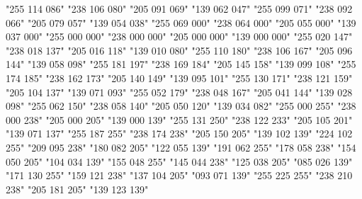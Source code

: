            {"255 114 086"}
           {"238 106 080"}
           {"205 091 069"}
           {"139 062 047"}
          {"255 099 071"}
          {"238 092 066"}
          {"205 079 057"}
          {"139 054 038"}        
      {"255 069 000"}
      {"238 064 000"}
      {"205 055 000"}
      {"139 037 000"}
             {"255 000 000"}
             {"238 000 000"}
             {"205 000 000"}
             {"139 000 000"}
       {"255 020 147"}
       {"238 018 137"}
       {"205 016 118"}
       {"139 010 080"}
        {"255 110 180"}
        {"238 106 167"}
        {"205 096 144"}
        {"139 058 098"}        
            {"255 181 197"}
            {"238 169 184"}
            {"205 145 158"}
            {"139 099 108"}
      {"255 174 185"}
      {"238 162 173"}
      {"205 140 149"}
      {"139 095 101"}        
 {"255 130 171"}
 {"238 121 159"}
 {"205 104 137"}
 {"139 071 093"}
          {"255 052 179"}
          {"238 048 167"}
          {"205 041 144"}
          {"139 028 098"}
      {"255 062 150"}
      {"238 058 140"}
      {"205 050 120"}
      {"139 034 082"}
         {"255 000 255"}
         {"238 000 238"}
         {"205 000 205"}
         {"139 000 139"}
          {"255 131 250"}
          {"238 122 233"}
          {"205 105 201"}
          {"139 071 137"}
            {"255 187 255"}
            {"238 174 238"}
            {"205 150 205"}
            {"139 102 139"}         
   {"224 102 255"}
   {"209 095 238"}
   {"180 082 205"}
   {"122 055 139"}
     {"191 062 255"}
     {"178 058 238"}
     {"154 050 205"}
     {"104 034 139"}
          {"155 048 255"}
          {"145 044 238"}
          {"125 038 205"}
          {"085 026 139"}        
   {"171 130 255"}
   {"159 121 238"}
   {"137 104 205"}
   {"093 071 139"}
         {"255 225 255"}
         {"238 210 238"}
         {"205 181 205"}
         {"139 123 139"}
